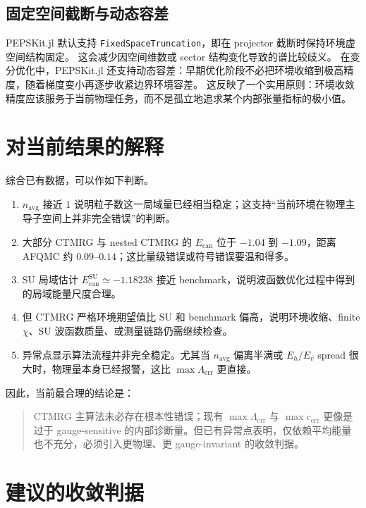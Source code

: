 \documentclass[11pt,a4paper]{ctexart}
\newcommand{\ctmrg}{CTMRG}
\newcommand{\pepskit}{PEPSKit.jl}
\newcommand{\Ecan}{E_{\mathrm{can}}}
\newcommand{\nb}{n_{\mathrm{avg}}}
\begin{document}
\subsection{固定空间截断与动态容差}

\pepskit{} 默认支持 \texttt{FixedSpaceTruncation}，即在 projector 截断时保持环境虚空间结构固定。
这会减少因空间维数或 sector 结构变化导致的谱比较歧义。
在变分优化中，\pepskit{} 还支持动态容差：早期优化阶段不必把环境收缩到极高精度，随着梯度变小再逐步收紧边界环境容差。
这反映了一个实用原则：环境收敛精度应该服务于当前物理任务，而不是孤立地追求某个内部张量指标的极小值。

\section{对当前结果的解释}

综合已有数据，可以作如下判断。

\begin{enumerate}[label=(\arabic*)]
  \item $\nb$ 接近 $1$ 说明粒子数这一局域量已经相当稳定；这支持“当前环境在物理主导子空间上并非完全错误”的判断。
  \item 大部分 \ctmrg{} 与 nested \ctmrg{} 的 $\Ecan$ 位于 $-1.04$ 到 $-1.09$，距离 AFQMC 约 $0.09$--$0.14$；这比量级错误或符号错误要温和得多。
  \item SU 局域估计 $\Ecan^{\mathrm{SU}}\simeq -1.18238$ 接近 benchmark，说明波函数优化过程中得到的局域能量尺度合理。
  \item 但 \ctmrg{} 严格环境期望值比 SU 和 benchmark 偏高，说明环境收缩、finite $\chi$、SU 波函数质量、或测量链路仍需继续检查。
  \item 异常点显示算法流程并非完全稳定。尤其当 $\nb$ 偏离半满或 $E_h/E_v$ spread 很大时，物理量本身已经报警，这比 $\max\Lambda_{\mathrm{err}}$ 更直接。
\end{enumerate}

因此，当前最合理的结论是：
\begin{quote}
  \ctmrg{} 主算法未必存在根本性错误；现有 $\max\Lambda_{\mathrm{err}}$ 与 $\max c_{\mathrm{err}}$ 更像是过于 gauge-sensitive 的内部诊断量。但已有异常点表明，仅依赖平均能量也不充分，必须引入更物理、更 gauge-invariant 的收敛判据。
\end{quote}

\section{建议的收敛判据}
\end{document}
